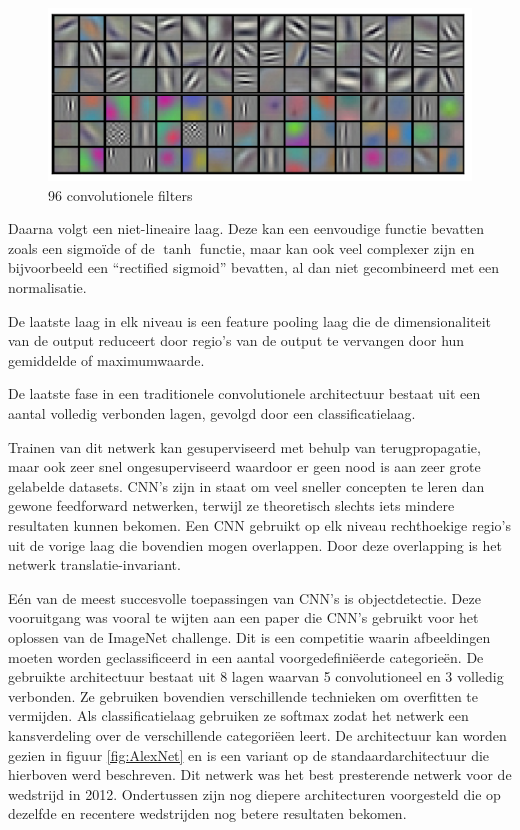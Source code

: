 \begin{figure}[tb]
    \centering
    \includegraphics[width=.7\textwidth]{Images/cnnfilters.PNG}
    \caption{96 convolutionele filters\cite{Krizhevsky2012a}}
    \label{fig:cnnfilters}
\end{figure}

Daarna volgt een niet-lineaire laag. Deze kan een eenvoudige functie bevatten zoals een sigmo\"ide of de $\tanh$ functie, maar kan ook veel complexer zijn en bijvoorbeeld een ``rectified sigmoid'' bevatten, al dan niet gecombineerd met een normalisatie.

De laatste laag in elk niveau is een feature pooling laag die de dimensionaliteit van de output reduceert door regio's van de output te vervangen door hun gemiddelde of maximumwaarde.

De laatste fase in een traditionele convolutionele architectuur bestaat uit een aantal volledig verbonden lagen, gevolgd door een classificatielaag.

Trainen van dit netwerk kan gesuperviseerd met behulp van terugpropagatie, maar ook zeer snel ongesuperviseerd waardoor er geen nood is aan zeer grote gelabelde datasets. CNN's zijn in staat om veel sneller concepten te leren dan gewone feedforward netwerken, terwijl ze theoretisch slechts iets mindere resultaten kunnen bekomen. Een CNN gebruikt op elk niveau rechthoekige regio's uit de vorige laag die bovendien mogen overlappen. Door deze overlapping is het netwerk translatie-invariant.

E\'en van de meest succesvolle toepassingen van CNN's is objectdetectie. Deze vooruitgang was vooral te wijten aan een paper\cite{Krizhevsky2012a} die CNN's gebruikt voor het oplossen van de ImageNet challenge.\cite{Russakovsky2014}
Dit is een competitie waarin afbeeldingen moeten worden geclassificeerd in een aantal voorgedefini\"eerde categorie\"en. De gebruikte architectuur bestaat uit 8 lagen waarvan 5 convolutioneel en 3 volledig verbonden. Ze gebruiken bovendien verschillende technieken om overfitten te vermijden. Als classificatielaag gebruiken ze softmax zodat het netwerk een kansverdeling over de verschillende categori\"een leert. De architectuur kan worden gezien in figuur \ref{fig:AlexNet} en  is een variant op de standaardarchitectuur die hierboven werd beschreven. Dit netwerk was het best presterende netwerk voor de wedstrijd in 2012. Ondertussen zijn nog diepere architecturen voorgesteld die op dezelfde en recentere wedstrijden nog betere resultaten bekomen.

